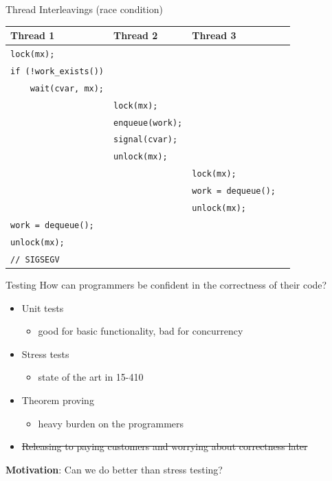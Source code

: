 \documentclass[xcolor=dvipsnames]{beamer}
\begin{document}
\begin{frame}{Thread Interleavings (race condition)}
	\begin{center}
		\begin{tabular}{|l|l|l|}
			\hline
			\cellcolor{thread1} {\bf Thread 1} & \cellcolor{thread2} {\bf Thread 2} & \cellcolor{thread3} {\bf Thread 3} \\
			\hline
			\small \texttt{lock(mx);} & & \\
			\small \texttt{if~(!work\_exists())} & & \\
			\small \texttt{~~~~wait(cvar,~mx);} & & \\

			& \small \texttt{lock(mx);} & \\
			& \small \texttt{enqueue(work);} & \\
			& \small \texttt{signal(cvar);} & \\
			& \small \texttt{unlock(mx);} & \\

			& & \small \texttt{lock(mx);} \\
			& & \small \texttt{work~=~dequeue();~~} \\
			& & \small \texttt{unlock(mx);} \\

			\small \texttt{work~=~dequeue();} & & \\
			\small \texttt{unlock(mx);} & & \\
			\small \texttt{//~SIGSEGV} {\large \frownie}& & \\
			\hline
		\end{tabular}
	\end{center}
\end{frame}


\begin{frame}{Testing}
	How can programmers be confident in the correctness of their code?
	\begin{itemize}
		\item Unit tests
		\begin{itemize}
			\item good for basic functionality, bad for concurrency
		\end{itemize}
		\item Stress tests
		\begin{itemize}
			\item state of the art in 15-410
		\end{itemize}
		\item Theorem proving
		\begin{itemize}
			\item heavy burden on the programmers
		\end{itemize}
		\item \sout{Releasing to paying customers and worrying about correctness later}
	\end{itemize}
	\linegap

	{\bf Motivation}: Can we do better than stress testing?
\end{frame}
\end{document}
